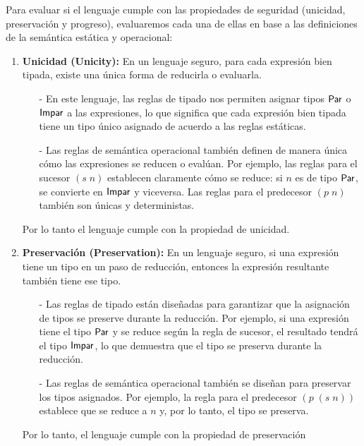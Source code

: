 \documentclass{article}
\begin{document}
\begin{enumerate}
\begin{enumerate}
            Para evaluar si el lenguaje cumple con las propiedades de seguridad (unicidad, preservación y progreso), evaluaremos cada una de ellas en base a las definiciones de la semántica estática y operacional:

            \begin{enumerate}
                \item \textbf{Unicidad (Unicity):} En un lenguaje seguro, para cada expresión bien tipada, existe una única forma de reducirla o evaluarla.
                \begin{itemize}
                    \item[-] En este lenguaje, las reglas de tipado nos permiten asignar tipos ${\sf Par}$ o ${\sf Impar}$ a las expresiones, lo que significa que cada expresión bien tipada tiene un tipo único asignado de acuerdo a las reglas estáticas.
                    \item[-] Las reglas de semántica operacional también definen de manera única cómo las expresiones se reducen o evalúan. Por ejemplo, las reglas para el sucesor $(s\;n)$ establecen claramente cómo se reduce: si $n$ es de tipo ${\sf Par}$, se convierte en ${\sf Impar}$ y viceversa. Las reglas para el predecesor $(p\;n)$ también son únicas y deterministas.
                \end{itemize}
                Por lo tanto el lenguaje cumple con la propiedad de unicidad.

                \item \textbf{Preservación (Preservation):} En un lenguaje seguro, si una expresión tiene un tipo en un paso de reducción, entonces la expresión resultante también tiene ese tipo.
                \begin{itemize}
                    \item[-] Las reglas de tipado están diseñadas para garantizar que la asignación de tipos se preserve durante la reducción. Por ejemplo, si una expresión tiene el tipo ${\sf Par}$ y se reduce según la regla de sucesor, el resultado tendrá el tipo ${\sf Impar}$, lo que demuestra que el tipo se preserva durante la reducción.

                    \item[-] Las reglas de semántica operacional también se diseñan para preservar los tipos asignados. Por ejemplo, la regla para el predecesor $(p\;(s\;n))$ establece que se reduce a $n$ y, por lo tanto, el tipo se preserva.
                \end{itemize}
                Por lo tanto, el lenguaje cumple con la propiedad de preservación


\end{enumerate}
\end{enumerate}
\end{enumerate}
\end{document}
